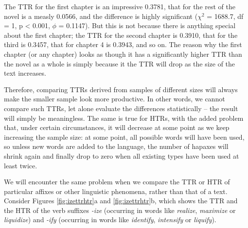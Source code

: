 The TTR for the first chapter is an impressive 0.3781, that for the rest of the novel is a measly 0.0566, and the difference is highly significant ($\chi^2$ = 1688.7, df = 1, p < 0.001, $\phi$ = 0.1147). But this is not because there is anything special about the first chapter; the TTR for the second chapter is 0.3910, that for the third is 0.3457, that for chapter 4 is 0.3943, and so on. The reason why the first chapter (or any chapter) looks as though it has a significantly higher TTR than the novel as a whole is simply because it the TTR will drop as the size of the text increases.

Therefore, comparing TTRs derived from samples of different sizes will always make the smaller sample look more productive. In other words, we cannot compare such TTRs, let alone evaluate the differences statistically -- the result will simply be meaningless. The same is true for HTRs, with the added problem that, under certain circumstances, it will decrease at some point as we keep increasing the sample size: at some point, all possible words will have been used, so unless new words are added to the language, the number of hapaxes will shrink again and finally drop to zero when all existing types have been used at least twice.

We will encounter the same problem when we compare the TTR or HTR of particular affixes or other linguistic phenomena, rather than that of a text. Consider Figures \ref{fig:izettrhtr}a and \ref{fig:izettrhtr}b, which shows the TTR and the HTR of the verb suffixes \textit{-ize} (occurring in words like \textit{realize}, \textit{maximize} or \textit{liquidize}) and \textit{-ify} (occurring in words like \textit{identify}, \textit{intensify} or \textit{liquify}).

